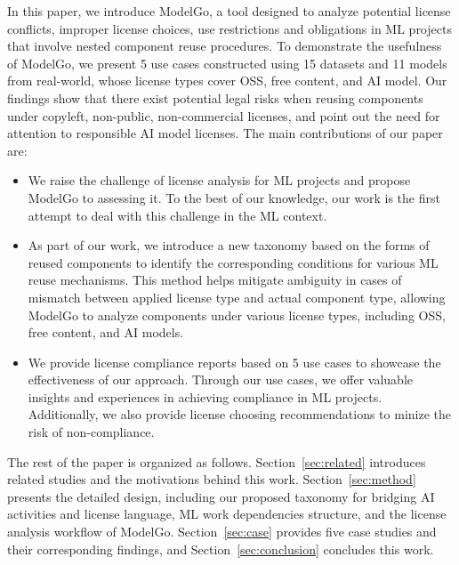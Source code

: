 In this paper, we introduce ModelGo, a tool designed to analyze potential license conflicts, improper license choices, use restrictions and obligations in ML projects that involve nested component reuse procedures.
To demonstrate the usefulness of ModelGo, we present 5 use cases constructed using 15 datasets and 11 models from real-world, whose license types cover OSS, free content, and AI model.
Our findings show that there exist potential legal risks when reusing  components under copyleft, non-public, non-commercial licenses, and point out the need for attention to responsible AI model licenses.
The main contributions of our paper are:
\begin{itemize}
    \item We raise the challenge of license analysis for ML projects and propose ModelGo to assessing it. To the best of our knowledge, our work is the first attempt to deal with this challenge in the ML context.
    \item As part of our work, we introduce a new taxonomy based on the forms of reused components to identify the corresponding conditions for various ML reuse mechanisms. This method helps mitigate ambiguity in cases of mismatch between applied license type and actual component type, allowing ModelGo to analyze components under various license types, including OSS, free content, and AI models.
    \item  We provide license compliance reports based on 5 use cases to showcase the effectiveness of our approach. 
    Through our use cases, we offer valuable insights and experiences in achieving compliance in ML projects. 
    Additionally, we also provide license choosing recommendations to minize the risk of non-compliance.
\end{itemize}

The rest of the paper is organized as follows.
Section~\ref{sec:related} introduces related studies and the motivations behind this work.
Section~\ref{sec:method} presents the detailed design, including our proposed taxonomy for bridging AI activities and license language, ML work dependencies structure, and the license analysis workflow of ModelGo.
Section~\ref{sec:case} provides five case studies and their corresponding findings, and Section~\ref{sec:conclusion} concludes this work.

